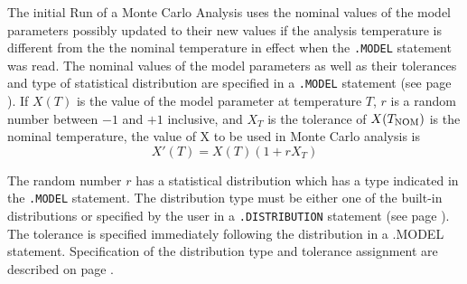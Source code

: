 
The initial Run of a Monte Carlo Analysis uses the nominal values of the
model parameters possibly updated to their new values if the analysis
temperature is different from the the nominal temperature in effect when the
{\tt .MODEL} statement was read.  The nominal values of the model parameters
as well as their tolerances and type of statistical distribution are
specified in a {\tt .MODEL} statement (see page \pageref{.MODELstatement}).
If $X(T)$ is the value of the model parameter at temperature $T$, $r$ is a
random number between $-1$ and $+1$ inclusive, and $X_T$ is the tolerance of
$X(T_{\mbox{\scriptsize NOM}})$ is the nominal temperature, the value of X to be used in
Monte Carlo analysis is
\begin{equation}
X'(T) = X(T)(1+rX_T)
\end{equation}

The random number $r$ has a statistical distribution which has a type indicated
in the {\tt .MODEL} statement. The distribution type must be either one of
the built-in distributions or specified by the user in a {\tt .DISTRIBUTION}
statement (see page \pageref{.DISTRIBUTIONstatement}).  The tolerance  is
specified immediately following the distribution in a {.MODEL} statement.
Specification of the distribution type and tolerance assignment are
described on page \pageref{.MODELstatementTOL}.


